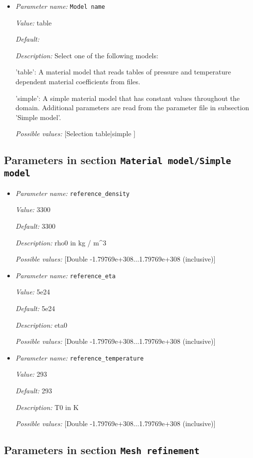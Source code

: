 \begin{itemize}
\item {\it Parameter name:} {\tt Model name}


{\it Value:} table


{\it Default:} 


{\it Description:} Select one of the following models:

'table': A material model that reads tables of pressure and temperature dependent material coefficients from files.

'simple': A simple material model that has constant values throughout the domain. Additional parameters are read from the parameter file in subsection 'Simple model'.


{\it Possible values:} [Selection table|simple ]
\end{itemize}



\subsection{Parameters in section \tt Material model/Simple model}

\begin{itemize}
\item {\it Parameter name:} {\tt reference_density}


{\it Value:} 3300


{\it Default:} 3300


{\it Description:} rho0 in kg / m^3


{\it Possible values:} [Double -1.79769e+308...1.79769e+308 (inclusive)]
\item {\it Parameter name:} {\tt reference_eta}


{\it Value:} 5e24


{\it Default:} 5e24


{\it Description:} eta0


{\it Possible values:} [Double -1.79769e+308...1.79769e+308 (inclusive)]
\item {\it Parameter name:} {\tt reference_temperature}


{\it Value:} 293


{\it Default:} 293


{\it Description:} T0 in K


{\it Possible values:} [Double -1.79769e+308...1.79769e+308 (inclusive)]
\end{itemize}

\subsection{Parameters in section \tt Mesh refinement}

